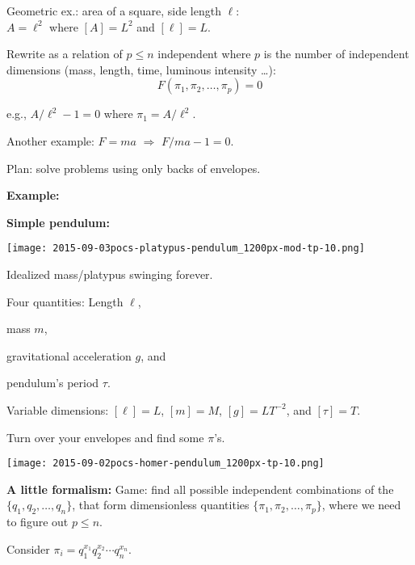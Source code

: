 Geometric ex.: area of a square, side length $\ell$:\\ 
$A = \ell^2$ where $[A] = L^2$ and $[\ell] = L$.

Rewrite as a relation of $p \le n$ independent
where $p$ is the number of independent dimensions (mass, length,
time, luminous intensity \ldots):
$$
F(\pi_1,\pi_2, \ldots, \pi_p) = 0
$$

e.g., $A/\ell^2 - 1 = 0$ where $\pi_1 = A/\ell^2$.

Another example: $F = ma$ $\Rightarrow$ $F/ma - 1 = 0$.

Plan: solve problems using only backs of envelopes.

\textbf{Example:}

\textbf{Simple pendulum:}

\begin{marginfigure}[]
  \texttt{[image: 2015-09-03pocs-platypus-pendulum\_1200px-mod-tp-10.png]}
\end{marginfigure}



Idealized mass/platypus swinging forever.

Four quantities: 
Length 
$\ell$, 

mass $m$, 

gravitational
acceleration $g$, 
and 

pendulum's period $\tau$.


Variable dimensions:
$[\ell] = L$, 
$[m] = M$, 
$[g] = L T^{-2}$,
and $[\tau] = T$.

Turn over your envelopes and find some $\pi$'s.
\begin{marginfigure}[]
  \texttt{[image: 2015-09-02pocs-homer-pendulum\_1200px-tp-10.png]}
\end{marginfigure}


\small

\textbf{A little formalism:}
Game: find all possible independent combinations of the
$\{q_1, q_2, \ldots, q_n\}$,
that form dimensionless quantities
$\{\pi_1, \pi_2, \ldots, \pi_p\}$,
where we need to figure out $p \le n$.

Consider 
$
\pi_i 
= 
q_1^{x_{1}} 
q_2^{x_{2}} 
\cdots
q_n^{x_{n}} 
$.

